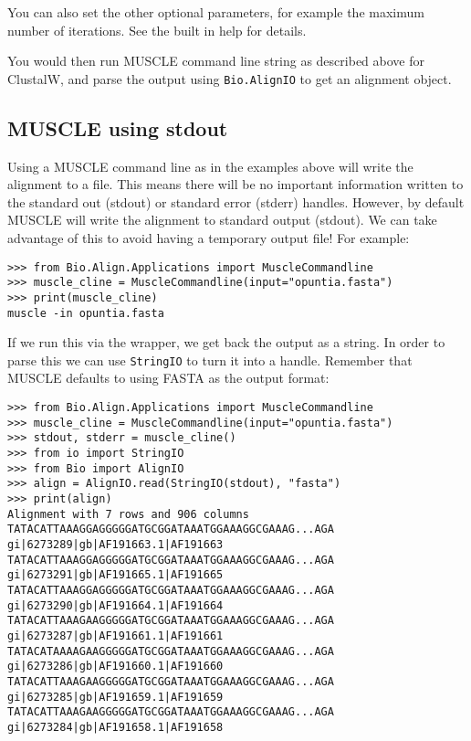 You can also set the other optional parameters, for example the maximum number
of iterations. See the built in help for details.

You would then run MUSCLE command line string as described above for
ClustalW, and parse the output using \verb|Bio.AlignIO| to get an
alignment object.

\subsection{MUSCLE using stdout}

Using a MUSCLE command line as in the examples above will write the alignment
to a file. This means there will be no important information written to the
standard out (stdout) or standard error (stderr) handles. However, by default
MUSCLE will write the alignment to standard output (stdout). We can take
advantage of this to avoid having a temporary output file! For example:

\begin{verbatim}
>>> from Bio.Align.Applications import MuscleCommandline
>>> muscle_cline = MuscleCommandline(input="opuntia.fasta")
>>> print(muscle_cline)
muscle -in opuntia.fasta
\end{verbatim}

If we run this via the wrapper, we get back the output as a string. In order
to parse this we can use \verb|StringIO| to turn it into a handle.
Remember that MUSCLE defaults to using FASTA as the output format:

\begin{verbatim}
>>> from Bio.Align.Applications import MuscleCommandline
>>> muscle_cline = MuscleCommandline(input="opuntia.fasta")
>>> stdout, stderr = muscle_cline()
>>> from io import StringIO
>>> from Bio import AlignIO
>>> align = AlignIO.read(StringIO(stdout), "fasta")
>>> print(align)
Alignment with 7 rows and 906 columns
TATACATTAAAGGAGGGGGATGCGGATAAATGGAAAGGCGAAAG...AGA gi|6273289|gb|AF191663.1|AF191663
TATACATTAAAGGAGGGGGATGCGGATAAATGGAAAGGCGAAAG...AGA gi|6273291|gb|AF191665.1|AF191665
TATACATTAAAGGAGGGGGATGCGGATAAATGGAAAGGCGAAAG...AGA gi|6273290|gb|AF191664.1|AF191664
TATACATTAAAGAAGGGGGATGCGGATAAATGGAAAGGCGAAAG...AGA gi|6273287|gb|AF191661.1|AF191661
TATACATAAAAGAAGGGGGATGCGGATAAATGGAAAGGCGAAAG...AGA gi|6273286|gb|AF191660.1|AF191660
TATACATTAAAGAAGGGGGATGCGGATAAATGGAAAGGCGAAAG...AGA gi|6273285|gb|AF191659.1|AF191659
TATACATTAAAGAAGGGGGATGCGGATAAATGGAAAGGCGAAAG...AGA gi|6273284|gb|AF191658.1|AF191658
\end{verbatim}

